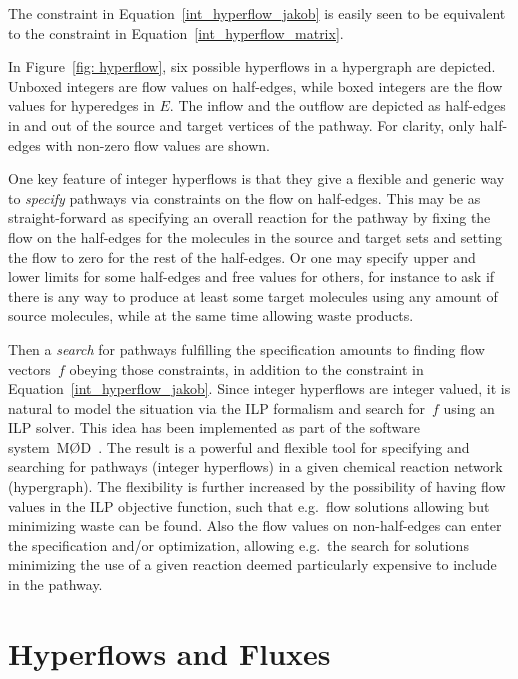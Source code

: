 \newpage
\noindent The constraint in Equation~\eqref{int_hyperflow_jakob} is easily seen to be equivalent to the constraint in Equation~\eqref{int_hyperflow_matrix}. 

In Figure~\ref{fig: hyperflow}, six possible hyperflows in a hypergraph are depicted.
Unboxed integers are flow values on half-edges, while boxed integers are the flow values for hyperedges in $E$.
The inflow and the outflow are depicted as half-edges in and out of the source and target vertices of the pathway.
For clarity, only half-edges with non-zero flow values are shown.

One key feature of integer hyperflows is that they give a flexible and generic way to \emph{specify} pathways via constraints on the flow on half-edges.
This may be as straight-forward as specifying an overall reaction for the pathway by fixing the flow on the half-edges for the molecules in the source and target sets and setting the flow to zero for the rest of the half-edges.
Or one may specify upper and lower limits for some half-edges and free values for others,
for instance to ask if there is any way to produce at least some target molecules using any amount of source molecules,
while at the same time allowing waste products.

Then a \emph{search} for pathways fulfilling the specification amounts to finding flow vectors~$f$ obeying those constraints, in addition to the constraint in Equation~\eqref{int_hyperflow_jakob}.
Since integer hyperflows are integer valued, it is natural to model the situation via the ILP formalism and search for~$f$ using an ILP solver.
This idea has been implemented as part of the software system~MØD~\cite{mod_web}.
The result is a powerful and flexible tool for specifying and searching for pathways (integer hyperflows) in a given chemical reaction network (hypergraph).
The flexibility is further increased by the possibility of having flow values in the ILP objective function, such that e.g.\ flow solutions allowing but minimizing waste can be found.
Also the flow values on non-half-edges can enter the specification and/or optimization,
allowing e.g.\ the search for solutions minimizing the use of a given reaction deemed particularly expensive to include in the pathway.

\section{Hyperflows and Fluxes}
\label{sec: comparison}

